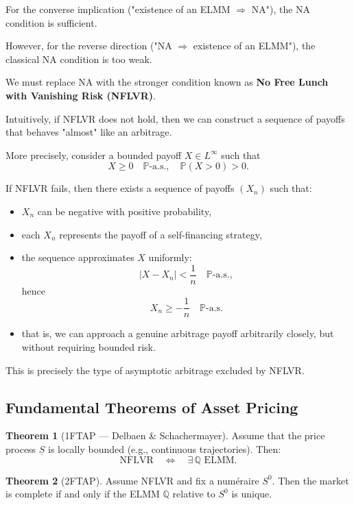 \documentclass[12pt,a4paper]{article}
\theoremstyle{definition}
\newtheorem{theorem}{Theorem}[section]
\begin{document}
For the converse implication ("existence of an ELMM $\Rightarrow$ NA"), the NA condition is sufficient.

However, for the reverse direction ("NA $\Rightarrow$ existence of an ELMM"), the classical NA condition is too weak.

We must replace NA with the stronger condition known as \textbf{No Free Lunch with Vanishing Risk (NFLVR)}.

Intuitively, if NFLVR does not hold, then we can construct a sequence of payoffs that behaves "almost" like an arbitrage.

More precisely, consider a bounded payoff $X \in L^\infty$ such that
\[
X \geq 0 \quad \mathbb{P}\text{-a.s.}, \quad \mathbb{P}(X > 0) > 0.
\]

If NFLVR fails, then there exists a sequence of payoffs $(X_n)$ such that:
\begin{itemize}
\item $X_n$ can be negative with positive probability,
\item each $X_n$ represents the payoff of a self-financing strategy,
\item the sequence approximates $X$ uniformly:
\[
|X - X_n| < \frac{1}{n} \quad \mathbb{P}\text{-a.s.},
\]
hence
\[
X_n \geq -\frac{1}{n} \quad \mathbb{P}\text{-a.s.}
\]
\item that is, we can approach a genuine arbitrage payoff arbitrarily closely, but without requiring bounded risk.
\end{itemize}

This is precisely the type of asymptotic arbitrage excluded by NFLVR.

\subsection{Fundamental Theorems of Asset Pricing}

\begin{theorem}[1FTAP — Delbaen \& Schachermayer]
Assume that the price process $\underline{S}$ is locally bounded (e.g., continuous trajectories). Then:
\[
\text{NFLVR} \quad \iff \quad \exists \, \mathbb{Q} \text{ ELMM}.
\]
\end{theorem}

\begin{theorem}[2FTAP]
Assume NFLVR and fix a numéraire $S^0$. Then the market is complete if and only if the ELMM $\mathbb{Q}$ relative to $S^0$ is unique.
\end{theorem}
\end{document}

